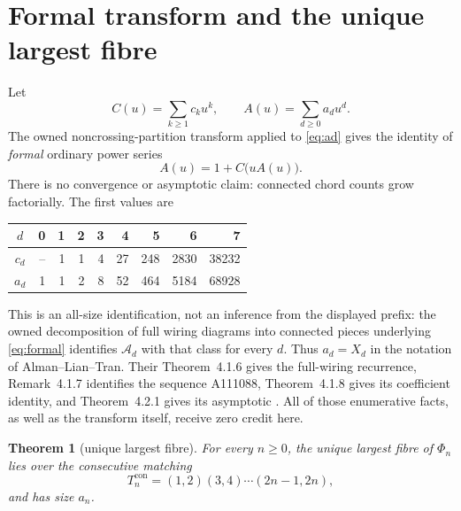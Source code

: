 \documentclass[10pt,a4paper]{amsart}
\newtheorem{theorem}{Theorem}[section]
\theoremstyle{definition}
\theoremstyle{remark}
\begin{document}
\section{Formal transform and the unique largest fibre}

Let
\[
 C(u)=\sum_{k\ge1}c_ku^k,
 \qquad A(u)=\sum_{d\ge0}a_du^d.
\]
The owned noncrossing-partition transform applied to \eqref{eq:ad} gives
the identity of \emph{formal} ordinary power series
\begin{equation}
                         A(u)=1+C\bigl(uA(u)\bigr).      \label{eq:formal}
\end{equation}
There is no convergence or asymptotic claim: connected chord counts grow
factorially.  The first values are
\begin{center}
\begin{tabular}{c@{\quad}rrrrrrrr}
\toprule
$d$ &0&1&2&3&4&5&6&7\\
\midrule
$c_d$ &--&1&1&4&27&248&2830&38232\\
$a_d$ &1&1&2&8&52&464&5184&68928\\
\bottomrule
\end{tabular}
\end{center}
This is an all-size identification, not an inference from the displayed
prefix: the owned decomposition of full wiring diagrams into connected
pieces underlying \eqref{eq:formal} identifies $\mathcal A_d$ with that
class for every $d$.  Thus $a_d=X_d$ in the notation of
Alman--Lian--Tran.  Their
Theorem~4.1.6 gives the full-wiring recurrence, Remark~4.1.7 identifies the
sequence A111088, Theorem~4.1.8 gives its coefficient identity, and
Theorem~4.2.1 gives its asymptotic \cite{AlmanLianTran2015}.  All of those
enumerative facts, as well as the transform itself, receive zero credit here.

\begin{theorem}[unique largest fibre]\label{thm:max}
For every $n\ge0$, the unique largest fibre of $\Phi_n$ lies over the
consecutive matching
\[
 T_n^{\mathrm{con}}=(1,2)(3,4)\cdots(2n-1,2n),
\]
and has size $a_n$.
\end{theorem}
\end{document}
